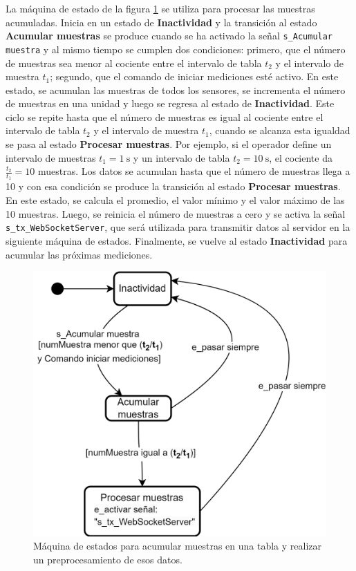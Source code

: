 La máquina de estado de la figura \ref{fig:sc_processing} se utiliza para procesar las muestras acumuladas. Inicia en un estado de \textbf{Inactividad} y la transición al estado \textbf{Acumular muestras} se produce cuando se ha activado la señal \texttt{s\_Acumular muestra}  y al mismo tiempo se cumplen dos condiciones: primero, que el número de muestras sea menor al cociente entre el intervalo de tabla $t_{2}$ y el intervalo de muestra $t_{1}$; segundo, que el comando de iniciar mediciones esté activo. En este estado, se acumulan las muestras de todos los sensores, se incrementa el número de muestras en una unidad y luego se regresa al estado de \textbf{Inactividad}. Este ciclo se repite hasta que el número de muestras es igual al cociente entre el intervalo de tabla $t_{2}$ y el intervalo de muestra $t_{1}$, cuando se alcanza esta igualdad se pasa al estado \textbf{Procesar muestras}. Por ejemplo, si el operador define un intervalo de muestras $t_{1} = \SI{1}{\second}$ y un intervalo de tabla $t_{2} = \SI{10}{\second}$, el cociente da $\frac{t_{2}}{t_{1}}=10$ muestras. Los datos se acumulan hasta que el número de muestras llega a 10 y con esa condición se produce la transición al estado \textbf{Procesar muestras}. En este estado, se calcula el promedio, el valor mínimo y el valor máximo de las 10 muestras. Luego, se reinicia el número de muestras a cero y se activa la señal \texttt{s\_tx\_WebSocketServer}, que será utilizada para transmitir datos al servidor en la siguiente máquina de estados. Finalmente, se vuelve al estado \textbf{Inactividad} para acumular las próximas mediciones.


\begin{figure}[H]
    \centering
    \includegraphics[width=0.6\linewidth]{Figuras/datalogger/Firmware/sc_processing.png}
    \caption{Máquina de estados para acumular muestras en una tabla y realizar un preprocesamiento de esos datos.}
    \label{fig:sc_processing}
\end{figure}

